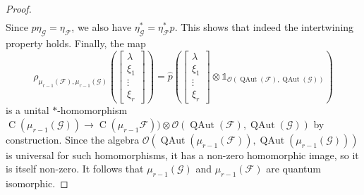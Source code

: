 \documentclass[10pt,a4paper]{amsart}
\DeclareMathOperator{\C}{C}
\DeclareMathOperator{\QAut}{QAut}
\newcommand{\I}{\mathds{1}}
\newcommand{\tens}{\otimes}
\begin{document}
\begin{proof}
\begin{align*}
\end{align*}
Since $p\eta_{\scriptscriptstyle\mathcal{G}}=\eta_{\scriptscriptstyle\mathcal{F}}$, we also have $\eta_{\scriptscriptstyle\mathcal{G}}^*=\eta_{\scriptscriptstyle\mathcal{F}}^* p$. This shows that indeed the intertwining property holds. Finally, the map
\[
\rho_{\scriptscriptstyle\mu_{r-1}(\mathcal{F}),\mu_{r-1}(\mathcal{G})}
\left(\left[\begin{smallmatrix}
\lambda\\\xi_1\\[-3pt]\vdots\\[1pt]\xi_r
\end{smallmatrix}\right]\right)
=\widehat{p}
\left(\left[\begin{smallmatrix}
\lambda\\\xi_1\\[-3pt]\vdots\\[1pt]\xi_r
\end{smallmatrix}\right]\tens\I_{\mathcal{O}(\QAut(\mathcal{F}),\QAut(\mathcal{G}))}\right)
\]
is a unital $*$-homomorphism $\C(\mu_{r-1}(\mathcal{G}))\to
\C(\mu_{r-1}\mathcal{F}))\tens\mathcal{O}(\QAut(\mathcal{F}),\QAut(\mathcal{G}))$ 
by construction. Since the algebra $\mathcal{O}(\QAut(\mu_{r-1}(\mathcal{F})),\QAut(\mu_{r-1}(\mathcal{G})))$ is universal for such homomorphisms, it has a non-zero homomorphic image, so it is itself non-zero. It follows that $\mu_{r-1}(\mathcal{G})$ and $\mu_{r-1}(\mathcal{F})$ are quantum isomorphic.
\end{proof}
\end{document}
